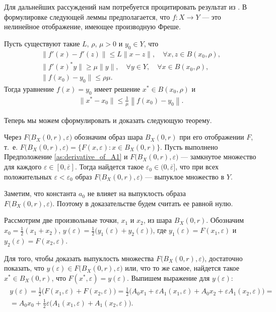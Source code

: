 \documentclass[../main.tex]{subfiles}
\begin{document}
Для дальнейших рассуждений нам потребуется процитировать результат из \cite{Polyak2001, Polyak1964}. 
В формулировке следующей леммы предполагается, что $f:X \to Y$ --- это нелинейное отображение, имеющее производную Фреше.
\begin{lemma}\label{lem:Polyak_lemma}
 Пусть существуют такие $L$, $\rho$, $\mu > 0$ и $y_0 \in Y$, что 
 \begin{gather*}
 \| f'(x) - f'(z) \| \leqslant L \| x - z\|, \quad \forall x,z \in B(x_0,\rho), \\
 \| f'(x)^*y \| \geqslant \mu \|y \|, \quad \forall y \in Y, \quad \forall x \in B(x_0, \rho), \\
 \| f(x_0) - y_0 \| \leqslant \rho \mu.
 \end{gather*}
 Тогда уравнение $f(x) = y_0$ имеет решение $x^* \in B(x_0,\rho)$ и 
 \begin{gather*}
 \|x^* - x_0\| \leqslant \frac{1}{\mu} \left\| f(x_0) - y_0 \right\|.
 \end{gather*}
\end{lemma}
Теперь мы можем сформулировать и доказать следующую теорему.
\begin{theorem}\label{th:ImageConvexity}
 Через $F\big(B_X(0,r),\varepsilon\big)$ обозначим образ шара $B_X(0, r)$ при его отображении $F$, т.~е. $F\big(B_X(0,r),\varepsilon\big) = \big\{F(x,\varepsilon): x\in B_X(0, r)\big\}$.
 Пусть выполнено Предположение \ref{as:derivative_of_A1} и $F\big(B_X(0,r),\varepsilon\big)$ --- замкнутое множество для каждого $\varepsilon \in [0, \overline{\varepsilon}]$. 
Тогда найдется такое $ \varepsilon_0 \in (0, \overline{\varepsilon}]$, что при всех положительных $\varepsilon < \varepsilon_0$ образ $F\big(B_X(0,r),\varepsilon\big)$ --- выпуклое множество в $Y$. 
\end{theorem}
\doc
Заметим, что константа $a_0$ не влияет на выпуклость образа \\ $F\big(B_X(0,r),\varepsilon\big)$. 
Поэтому в доказательстве будем считать ее равной нулю.

Рассмотрим две произвольные точки, $x_1$ и $x_2$, из шара $B_X(0,r)$. 
Обозначим \mbox{$x_0 = \frac{1}{2}(x_1 + x_2)$}, $y(\varepsilon) = \frac{1}{2}\big(y_1(\varepsilon) + y_2(\varepsilon)\big)$, где $y_1(\varepsilon) = F(x_1, \varepsilon)$ и $y_2(\varepsilon) = F(x_2, \varepsilon)$. 

Для того, чтобы доказать выпуклость множества $F\big(B_X(0,r),\varepsilon\big)$, достаточно показать, что $y(\varepsilon) \in F\big(B_X(0,r),\varepsilon\big)$ или, что то же самое, найдется такое $x^* \in B_X(0,r) $, что \mbox{$F(x^*, \varepsilon) = y(\varepsilon) $}.
Выпишем выражение для $y(\varepsilon)$:
\begin{gather}\label{y}
 \begin{gathered}
 y(\varepsilon)=
 \frac{1}{2} \big(
 F(x_1,\varepsilon)+ 
 F(x_2,\varepsilon)
 \big) = 
 \frac{1}{2} \big(
 A_0 x_1 +
 \varepsilon A_1(x_1,\varepsilon) +
 A_0 x_2 +
 \varepsilon A_1(x_2,\varepsilon) 
 \big) = \\ = A_0 x_0 + 
 \frac{1}{2} \varepsilon \big( 
 A_1(x_1,\varepsilon)+ 
 A_1(x_2,\varepsilon)
 \big).
 \end{gathered}
\end{gather}
\end{document}
